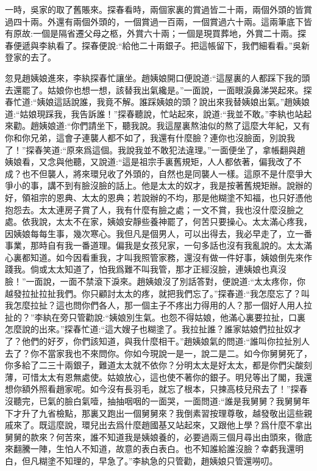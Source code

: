 \begin{parag}
    一時，吳家的取了舊賬來。探春看時，兩個家裏的賞過皆二十兩，兩個外頭的皆賞過四十兩。外還有兩個外頭的，一個賞過一百兩，一個賞過六十兩。這兩筆底下皆有原故:一個是隔省遷父母之柩，外賞六十兩；一個是現買葬地，外賞二十兩。探春便遞與李紈看了。探春便說:“給他二十兩銀子。把這帳留下，我們細看看。”吳新登家的去了。
\end{parag}


\begin{parag}
    忽見趙姨娘進來，李紈探春忙讓坐。趙姨娘開口便說道:“這屋裏的人都踩下我的頭去還罷了。姑娘你也想一想，該替我出氣纔是。”一面說，一面眼淚鼻涕哭起來。探春忙道:“姨娘這話說誰，我竟不解。誰踩姨娘的頭？說出來我替姨娘出氣。”趙姨娘道:“姑娘現踩我，我告訴誰！”探春聽說，忙站起來，說道:“我並不敢。”李紈也站起來勸。趙姨娘道:“你們請坐下，聽我說。我這屋裏熬油似的熬了這麼大年紀，又有你和你兄弟，這會子連襲人都不如了，我還有什麼臉？連你也沒臉面，別說我了！”探春笑道:“原來爲這個。我說我並不敢犯法違理。”一面便坐了，拿帳翻與趙姨娘看，又念與他聽，又說道:“這是祖宗手裏舊規矩，人人都依著，偏我改了不成？也不但襲人，將來環兒收了外頭的，自然也是同襲人一樣。這原不是什麼爭大爭小的事，講不到有臉沒臉的話上。他是太太的奴才，我是按著舊規矩辦。說辦的好，領祖宗的恩典、太太的恩典；若說辦的不均，那是他糊塗不知福，也只好憑他抱怨去。太太連房子賞了人，我有什麼有臉之處；一文不賞，我也沒什麼沒臉之處。依我說，太太不在家，姨娘安靜些養神罷了，何苦只要操心。太太滿心疼我，因姨娘每每生事，幾次寒心。我但凡是個男人，可以出得去，我必早走了，立一番事業，那時自有我一番道理。偏我是女孩兒家，一句多話也沒有我亂說的。太太滿心裏都知道。如今因看重我，才叫我照管家務，還沒有做一件好事，姨娘倒先來作踐我。倘或太太知道了，怕我爲難不叫我管，那才正經沒臉，連姨娘也真沒臉！”一面說，一面不禁滾下淚來。趙姨娘沒了別話答對，便說道:“太太疼你，你越發拉扯拉扯我們。你只顧討太太的疼，就把我們忘了。”探春道:“我怎麼忘了？叫我怎麼拉扯？這也問你們各人，那一個主子不疼出力得用的人？那一個好人用人拉扯的？”李紈在旁只管勸說:“姨娘別生氣。也怨不得姑娘，他滿心裏要拉扯，口裏怎麼說的出來。”探春忙道:“這大嫂子也糊塗了。我拉扯誰？誰家姑娘們拉扯奴才了？他們的好歹，你們該知道，與我什麼相干。”趙姨娘氣的問道:“誰叫你拉扯別人去了？你不當家我也不來問你。你如今現說一是一，說二是二。如今你舅舅死了，你多給了二三十兩銀子，難道太太就不依你？分明太太是好太太，都是你們尖酸刻薄，可惜太太有恩無處使。姑娘放心，這也使不著你的銀子。明兒等出了閣，我還想你額外照看趙家呢。如今沒有長羽毛，就忘了根本，只揀高枝兒飛去了！”探春沒聽完，已氣的臉白氣噎，抽抽咽咽的一面哭，一面問道:“誰是我舅舅？我舅舅年下才升了九省檢點，那裏又跑出一個舅舅來？我倒素習按理尊敬，越發敬出這些親戚來了。既這麼說，環兒出去爲什麼趙國基又站起來，又跟他上學？爲什麼不拿出舅舅的款來？何苦來，誰不知道我是姨娘養的，必要過兩三個月尋出由頭來，徹底來翻騰一陣，生怕人不知道，故意的表白表白。也不知誰給誰沒臉？幸虧我還明白，但凡糊塗不知理的，早急了。”李紈急的只管勸，趙姨娘只管還嘮叨。
\end{parag}


